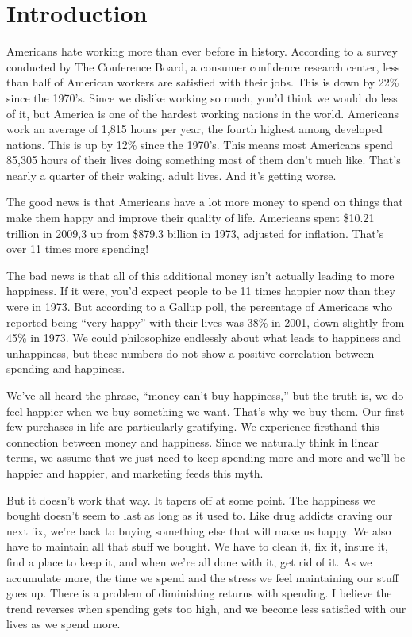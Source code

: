 \chapter{Introduction}
Americans hate working more than ever before in history. According to a survey conducted by The Conference Board, a consumer confidence research center, less than half of American workers are satisfied with their jobs. This is down by 22\% since the 1970's.\cite{livescience}
Since we dislike working so much, you'd think we would do less of it, but America is one of the hardest working nations in the world. Americans work an average of 1,815 hours per year, the fourth highest among developed nations. This is up by 12\% since the 1970's.\cite{anderson-cnn} This means most Americans spend 85,305 hours of their lives doing something most of them don't much like. That's nearly a quarter of their waking, adult lives. And it's getting worse.

The good news is that Americans have a lot more money to spend on things that make them happy and improve their quality of life. Americans spent \$10.21 trillion in 2009,3 up from \$879.3 billion in 1973, adjusted for inflation.\cite{american-consumer-spending} That's over 11 times more spending!

The bad news is that all of this additional money isn't actually leading to more happiness. If it were, you'd expect people to be 11 times happier now than they were in 1973. But according to a Gallup poll, the percentage of Americans who reported being ``very happy'' with their lives was 38\% in 2001, down slightly from 45\% in 1973.\cite{1973-consumer-spending} We could philosophize endlessly about what leads to happiness and unhappiness, but these numbers do not show a positive correlation between spending and happiness.

We've all heard the phrase, ``money can't buy happiness,'' but the truth is, we do feel happier when we buy something we want. That's why we buy them. Our first few purchases in life are particularly gratifying. We experience firsthand this connection between money and happiness. Since we naturally think in linear terms, we assume that we just need to keep spending more and more and we'll be happier and happier, and marketing feeds this myth.

But it doesn't work that way. It tapers off at some point. The happiness we bought doesn't seem to last as long as it used to. Like drug addicts craving our next fix, we're back to buying something else that will make us happy. We also have to maintain all that stuff we bought. We have to clean it, fix it, insure it, find a place to keep it, and when we're all done with it, get rid of it. As we accumulate more, the time we spend and the stress we feel maintaining our stuff goes up. There is a problem of diminishing returns with spending. I believe the trend reverses when spending gets too high, and we become less satisfied with our lives as we spend more.

